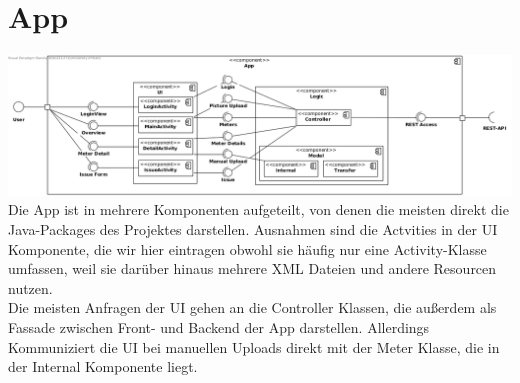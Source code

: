 \section{App}
\includegraphics[scale=0.45]{img/diagrams/AppComponentDiagram} 
Die App ist in mehrere Komponenten aufgeteilt, von denen die meisten direkt die Java-Packages des Projektes darstellen. Ausnahmen sind die Actvities in der UI Komponente, die wir hier eintragen obwohl sie häufig nur eine Activity-Klasse umfassen, weil sie darüber hinaus mehrere XML Dateien und andere Resourcen nutzen.\\
Die meisten Anfragen der UI gehen an die Controller Klassen, die außerdem als Fassade zwischen Front- und Backend der App darstellen. Allerdings Kommuniziert die UI bei manuellen Uploads direkt mit der Meter Klasse, die in der Internal Komponente liegt.\\ 

